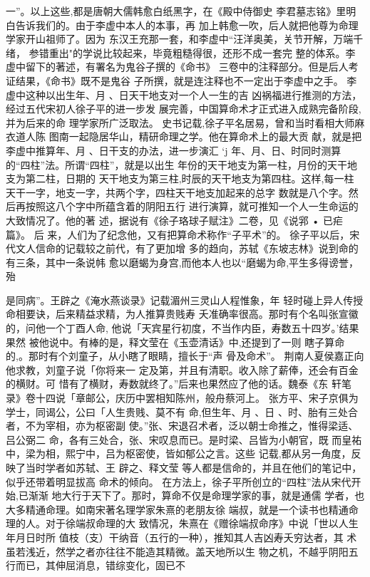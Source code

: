 一”。以上这些,都是唐朝大儒韩愈白纸黑字，在《殿中侍御史
李君墓志铭》里明白告诉我们的。由于李虚中本人的本事，再
加上韩愈一吹，后人就把他尊为命理学家开山祖师了。因为
东汉王充那一套，和李虚中“汪洋奥美，关节开解，万端千绪，
参错重出"的学说比较起来，毕竟粗糙得很，还形不成一套完
整的体系。李虚中留下的著述，有署名为鬼谷子撰的《命书》
三卷中的注释部分。但是后人考证结果，《命书》既不是鬼谷
子所撰，就是连注释也不一定出于李虚中之手。
李虚中这种以出生年、月 、日天干地支对一个人一生的吉
凶祸福进行推测的方法，经过五代宋初人徐子平的进一步发
展完善，中国算命术才正式进入成熟完备阶段,并为后来的命
理学家所广泛取法。
史书记载,徐子平名居易，曾和当时看相大师麻衣道人陈
图南一起隐居华山，精研命理之学。他在算命术上的最大贡
献，就是把李虚中推算年、月 、日干支的办法，进一步演汇 ‘j
年、月、日、时同时测算的“四柱”法。所谓“四柱”，就是以出生
年份的天干地支为第一柱，月份的天干地支为第二柱，日期的
天干地支为第三柱,时辰的天干地支为第四柱。这样,每一柱
天干一字，地支一字，共两个字，四柱天干地支加起来的总字
数就是八个字。然后再按照这八个字中所蕴含着的阴阳五行
进行演算，就可推知一个人一生命运的大致情况了。他的著
述，据说有《徐子珞球子赋注》二卷，见《说郛 • 已疟篇》。 后
来，人们为了纪念他，又有把算命术称作“子平术”的。
徐子平以后，宋代文人信命的记载较之前代，有了更加增
多的趋向，苏轼《东坡志林》说到命的有三条，其中一条说帏
愈以磨蝎为身宫,而他本人也以“磨蝎为命,平生多得谤誉，殆

是同病”。王辟之《淹水燕谈录》记载湄州三灵山人程惟象，年
轻时碰上异人传授命相要诀，后来精益求精，为人推算贵贱寿
夭准确率很高。那时有个名叫张宣徽的，问他一个丁酉人命,
他说「天宾星行初度，不当作内臣，寿数五十四岁。'结果果然
被他说中。有棒的是，释文莹在《玉壶清话》中,还提到了一则
瞎子算命的,。那时有个刘童子，从小瞎了眼睛，擅长于“声
骨及命术”。 荆南人夏侯嘉正向他求教，刘童子说「你将来一
定及第，并且有清职。收入除了薪俸，还会有百金的横财。可
惜有了横财，寿数就终了。”后来也果然应了他的话。魏泰《东
轩笔录》卷十四说「章邮公，庆历中罢相知陈州，般舟蔡河上。
张方平、宋子京俱为学士，同谒公，公曰「人生贵贱、莫不有
命,但生年、月 、日 、时、胎有三处合者，不为宰相，亦为枢密副
使。”张、宋退召术者，泛以朝士命推之，惟得梁适、吕公弼二
命，各有三处合，张、宋叹息而已。是时梁、吕皆为小朝官，既
而皇祐中，梁为相，熙宁中，吕为枢密使，皆如郁公之言。这些
记载,都从另一角度，反映了当时学者如苏轼、王 辟之、释文莹
等人都是信命的，并且在他们的笔记中，似乎还带着明显拔高
命术的倾向。
在方法上，徐子平所创立的“四柱”法从宋代开始,已渐渐
地大行于天下了。那时，算命不仅是命理学家的事，就是通儒
学者，也大多精通命理。如南宋著名理学家朱熹的老朋友徐
端叔，就是一个读书也精通命理的人。对于徐端叔命理的大
致情况，朱熹在《赠徐端叔命序》中说「世以人生年月日时所
值枝（支）干纳音（五行的一种），推知其人吉凶寿夭穷达者，其
术虽若浅近，然学之者亦往往不能造其精微。盖天地所以生
物之机，不越乎阴阳五行而已，其伸屈消息，错综变化，固已不

